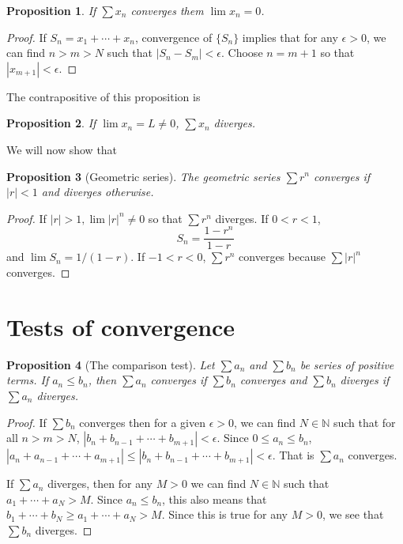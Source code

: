 \documentclass{article}
\theoremstyle{plain}
\numberwithin{thm}{section}
\theoremstyle{plain}
\newtheorem{prop}{Proposition}
\numberwithin{prop}{section}
\theoremstyle{definition}
\numberwithin{defn}{section}
\theoremstyle{remark}
\numberwithin{equation}{section}
\begin{document}
\begin{prop}\label{s3p2}
If $\sum x_n$ converges them $\lim x_n = 0$.
\end{prop}
\begin{proof}
If $S_n = x_1 + \cdots + x_n$, convergence of $\{S_n\}$ implies that for any
$\epsilon > 0$, we can find $n > m > N$ such that $|S_n - S_m| < \epsilon$.
Choose $n = m + 1$ so that $|x_{m+1}| < \epsilon$.
\end{proof}

The contrapositive of this proposition is
\begin{prop}\label{s3p3}
If $\lim x_n = L \ne 0$, $\sum x_n$ diverges.
\end{prop}

We will now show that
\begin{prop}[Geometric series]\label{s3p4}
The geometric series $\sum r^n$ converges if $|r| < 1$ and diverges 
otherwise.
\end{prop}
\begin{proof}
If $|r| > 1, \lim |r|^n \ne 0$ so that $\sum r^n$ diverges. If $0 < r < 1$, 
\[
S_n = \frac{1 - r^n}{1 - r}
\]
and $\lim S_n = 1/(1 - r)$. If $-1 < r < 0$, $\sum r^n$ converges because 
$\sum |r|^n$ converges.
\end{proof}

\section{Tests of convergence}\label{s4}
\begin{prop}[The comparison test]\label{s4p1}
Let $\sum a_n$ and $\sum b_n$ be series of positive terms. If $a_n \le b_n$,
then $\sum a_n$ converges if $\sum b_n$ converges and $\sum b_n$ diverges if
$\sum a_n$ diverges.
\end{prop}
\begin{proof}
If $\sum b_n$ converges then for a given $\epsilon > 0$, we can find $N \in
\mathbb{N}$ such that for all $n > m > N$, $|b_n + b_{n-1} + \cdots + b_{m+1}| 
< \epsilon$. Since $0 \le a_n \le b_n$, $|a_n + a_{n-1} + \cdots + a_{m+1}| \le
|b_n + b_{n-1} + \cdots + b_{m+1}| < \epsilon$. That is $\sum a_n$ converges.

If $\sum a_n$ diverges, then for any $M > 0$ we can find $N \in \mathbb{N}$ 
such that $a_1 + \cdots + a_N > M$. Since $a_n \le b_n$, this also means that
$b_1 + \cdots + b_N \ge a_1 + \cdots + a_N > M$. Since this is true for any $M
> 0$, we see that $\sum b_n$ diverges.
\end{proof}
\end{document}
